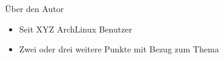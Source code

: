 
\begin{slide}{\"{U}ber den Autor}
	\begin{itemize}
		\item{Seit XYZ ArchLinux Benutzer}
		\item{Zwei oder drei weitere Punkte mit Bezug zum Thema}
	\end{itemize}
\end{slide}
